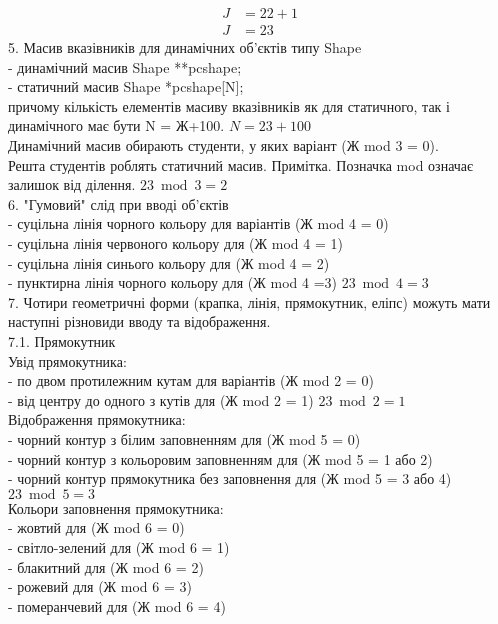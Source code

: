 \documentclass[14pt]{article}
\begin{document}
\begin{align}
    J &= 22 + 1 \\
    J &= 23
\end{align}
5. Масив вказівників для динамічних об’єктів типу Shape\\
- динамічний масив Shape **pcshape;\\
- статичний масив Shape *pcshape[N];\\
причому кількість елементів масиву вказівників як для статичного, так і динамічного має бути N = Ж+100. $ N = 23 + 100$\\
Динамічний масив обирають студенти, у яких варіант (Ж mod 3 = 0).\\
Решта студентів роблять статичний масив. Примітка. Позначка mod означає залишок від ділення. $ 23 \bmod 3 = 2$\\
6. "Гумовий" слід при вводі об’єктів\\
- суцільна лінія чорного кольору для варіантів (Ж mod 4 = 0)\\
- суцільна лінія червоного кольору для (Ж mod 4 = 1)\\
- суцільна лінія синього кольору для (Ж mod 4 = 2)\\
- пунктирна лінія чорного кольору для (Ж mod 4 =3) $ 23 \bmod 4 = 3$\\
7. Чотири геометричні форми (крапка, лінія, прямокутник, еліпс) можуть мати наступні різновиди вводу та відображення.\\
7.1. Прямокутник\\
Увід прямокутника:\\
- по двом протилежним кутам для варіантів (Ж mod 2 = 0)\\
- від центру до одного з кутів для (Ж mod 2 = 1) $ 23 \bmod 2 = 1$\\
Відображення прямокутника:\\
- чорний контур з білим заповненням для (Ж mod 5 = 0)\\
- чорний контур з кольоровим заповненням для (Ж mod 5 = 1 або 2)\\
- чорний контур прямокутника без заповнення для (Ж mod 5 = 3 або 4) $ 23 \bmod 5 = 3$\\
Кольори заповнення прямокутника:\\
- жовтий для (Ж mod 6 = 0)\\
- світло-зелений для (Ж mod 6 = 1)\\
- блакитний для (Ж mod 6 = 2)\\
- рожевий для (Ж mod 6 = 3)\\
- померанчевий для (Ж mod 6 = 4)\\
\end{document}
